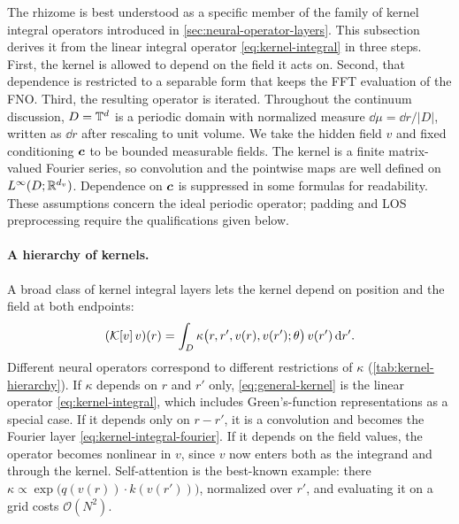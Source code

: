 The rhizome is best understood as a specific member of the family of kernel integral operators introduced in \cref{sec:neural-operator-layers}. This subsection derives it from the linear integral operator \cref{eq:kernel-integral} in three steps. First, the kernel is allowed to depend on the field it acts on. Second, that dependence is restricted to a separable form that keeps the FFT evaluation of the FNO. Third, the resulting operator is iterated. Throughout the continuum discussion, $D=\mathbb{T}^d$ is a periodic domain with normalized measure $\dd\mu=\dd r/|D|$, written as $\dd r$ after rescaling to unit volume. We take the hidden field $v$ and fixed conditioning $\bm{c}$ to be bounded measurable fields. The kernel is a finite matrix-valued Fourier series, so convolution and the pointwise maps are well defined on $L^\infty(D;\mathbb{R}^{d_v})$. Dependence on $\bm{c}$ is suppressed in some formulas for readability. These assumptions concern the ideal periodic operator; padding and LOS preprocessing require the qualifications given below.

\paragraph{A hierarchy of kernels.} A broad class of kernel integral layers lets the kernel depend on position and the field at both endpoints:
\begin{equation}
  \label{eq:general-kernel}
  (\mathcal{K}[v]\,v)(r) = \int_D \kappa\big(r,r',v(r),v(r');\theta\big)\,v(r')\,\mathrm{d} r'.
\end{equation}
Different neural operators correspond to different restrictions of $\kappa$ (\cref{tab:kernel-hierarchy}). If $\kappa$ depends on $r$ and $r'$ only, \cref{eq:general-kernel} is the linear operator \cref{eq:kernel-integral}, which includes Green's-function representations as a special case. If it depends only on $r-r'$, it is a convolution and becomes the Fourier layer \cref{eq:kernel-integral-fourier}. If it depends on the field values, the operator becomes nonlinear in $v$, since $v$ now enters both as the integrand and through the kernel. Self-attention \citep{vaswani2017attention} is the best-known example: there $\kappa\propto\exp\!\big(q(v(r))\cdot k(v(r'))\big)$, normalized over $r'$, and evaluating it on a grid costs $\mathcal{O}(N^2)$.

